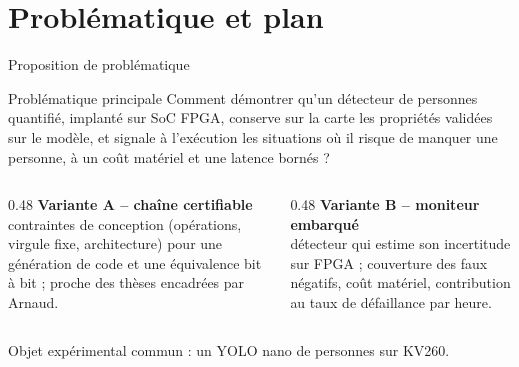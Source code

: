 \documentclass[aspectratio=169,11pt]{beamer}
\newcommand{\prop}{\hfill{\scriptsize\color{acc}\fbox{proposition}}}
\begin{document}
\section{Problématique et plan}

\begin{frame}{Proposition de problématique \prop}
  \begin{block}{Problématique principale}
    Comment \alert{démontrer} qu'un détecteur de personnes quantifié, implanté sur SoC FPGA,
    conserve sur la carte les propriétés validées sur le modèle, et \alert{signale à
    l'exécution} les situations où il risque de manquer une personne, à un coût matériel
    et une latence bornés ?
  \end{block}

  \vspace{0.3em}
  \small
  \begin{columns}[T]
    \begin{column}{0.48\textwidth}
      \textbf{Variante A -- chaîne certifiable}\\
      contraintes de conception (opérations, virgule fixe, architecture) pour une génération
      de code et une équivalence bit à bit ; proche des thèses encadrées par Arnaud.
    \end{column}
    \begin{column}{0.48\textwidth}
      \textbf{Variante B -- moniteur embarqué}\\
      détecteur qui estime son incertitude sur FPGA ; couverture des faux négatifs, coût
      matériel, contribution au taux de défaillance par heure.
    \end{column}
  \end{columns}

  \vspace{0.4em}
  Objet expérimental commun : un YOLO nano de personnes sur KV260.
\end{frame}
\end{document}
